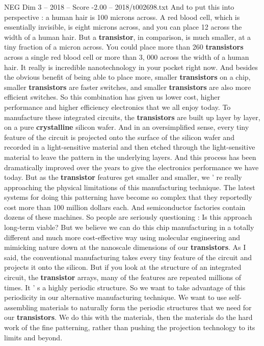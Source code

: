 \begin{textsample}{NEG Dim 3 – 2018 – Score -2.00 – 2018/t002698.txt}
And to put this into perspective : a human hair is 100 microns across.
A red blood cell, which is essentially invisible, is eight microns across, and you can place 12 across the width of a human hair.
But a \textbf{transistor}, in comparison, is much smaller, at a tiny fraction of a micron across.
You could place more than 260 \textbf{transistors} across a single red blood cell or more than 3, 000 across the width of a human hair.
It really is incredible nanotechnology in your pocket right now.
And besides the obvious benefit of being able to place more, smaller \textbf{transistors} on a chip, smaller \textbf{transistors} are faster switches, and smaller \textbf{transistors} are also more efficient switches.
So this combination has given us lower cost, higher performance and higher efficiency electronics that we all enjoy today.
To manufacture these integrated circuits, the \textbf{transistors} are built up layer by layer, on a pure \textbf{crystalline} silicon wafer.
And in an oversimplified sense, every tiny feature of the circuit is projected onto the surface of the silicon wafer and recorded in a light-sensitive material and then etched through the light-sensitive material to leave the pattern in the underlying layers.
And this process has been dramatically improved over the years to give the electronics performance we have today.
But as the \textbf{transistor} features get smaller and smaller, we ' re really approaching the physical limitations of this manufacturing technique.
The latest systems for doing this patterning have become so complex that they reportedly cost more than 100 million dollars each.
And semiconductor factories contain dozens of these machines.
So people are seriously questioning : Is this approach long-term viable?
But we believe we can do this chip manufacturing in a totally different and much more cost-effective way using molecular engineering and mimicking nature down at the nanoscale dimensions of our \textbf{transistors}.
As I said, the conventional manufacturing takes every tiny feature of the circuit and projects it onto the silicon.
But if you look at the structure of an integrated circuit, the \textbf{transistor} arrays, many of the features are repeated millions of times.
It ' s a highly periodic structure.
So we want to take advantage of this periodicity in our alternative manufacturing technique.
We want to use self-assembling materials to naturally form the periodic structures that we need for our \textbf{transistors}.
We do this with the materials, then the materials do the hard work of the fine patterning, rather than pushing the projection technology to its limits and beyond.

\end{textsample}

